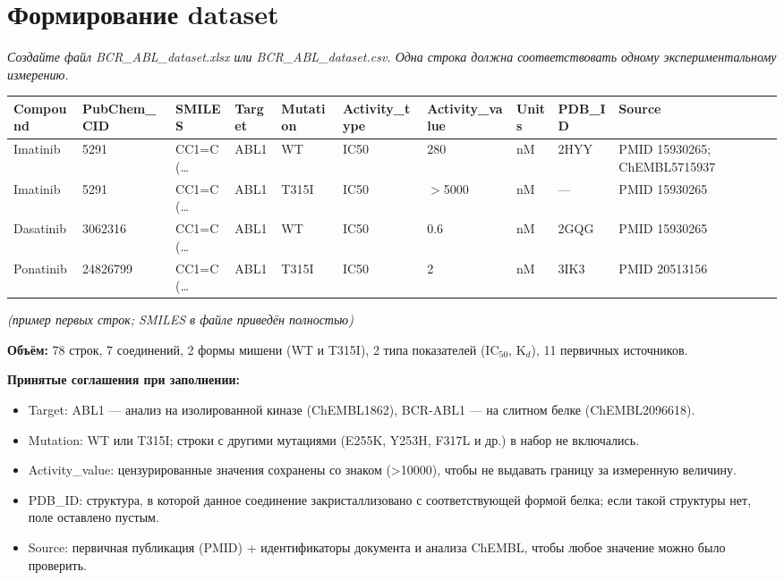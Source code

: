 \documentclass[11pt,a4paper]{article}
\newcommand{\code}[1]{{\ttfamily #1}}
\newcommand{\instr}[1]{{\small\itshape #1\par}}
\begin{document}
\section{Формирование dataset}
\instr{Создайте файл BCR\_ABL\_dataset.xlsx или BCR\_ABL\_dataset.csv. Одна строка должна
соответствовать одному экспериментальному измерению.}

\begin{center}
\tiny
\begin{tabular}{|L{1.5cm}|L{1.1cm}|L{1.4cm}|L{0.9cm}|L{1.1cm}|L{1.0cm}|L{1.0cm}|L{0.6cm}|L{0.9cm}|L{2.3cm}|}
\hline
\textbf{Compound} & \textbf{PubChem\_\allowbreak{}CID} & \textbf{SMILES} & \textbf{Target} &
\textbf{Mutation} & \textbf{Activity\_\allowbreak{}type} & \textbf{Activity\_\allowbreak{}value} & \textbf{Units} &
\textbf{PDB\_ID} & \textbf{Source} \\
\hline
Imatinib & 5291 & CC1=C(\ldots & ABL1 & WT & IC50 & 280 & nM & 2HYY &
PMID 15930265;\allowbreak{} ChEMBL5715937 \\
\hline
Imatinib & 5291 & CC1=C(\ldots & ABL1 & T315I & IC50 & $>$5000 & nM & --- &
PMID 15930265 \\
\hline
Dasatinib & 3062316 & CC1=C(\ldots & ABL1 & WT & IC50 & 0.6 & nM & 2GQG &
PMID 15930265 \\
\hline
Ponatinib & 24826799 & CC1=C(\ldots & ABL1 & T315I & IC50 & 2 & nM & 3IK3 &
PMID 20513156 \\
\hline
\end{tabular}
\end{center}

\emph{(пример первых строк; SMILES в файле приведён полностью)}

\textbf{Объём:} 78 строк, 7 соединений, 2 формы мишени (WT и T315I), 2 типа показателей
(IC$_{50}$, K$_d$), 11 первичных источников.

\textbf{Принятые соглашения при заполнении:}
\begin{itemize}[leftmargin=*,topsep=2pt,itemsep=2pt]
\item \code{Target}: \code{ABL1} --- анализ на изолированной киназе (ChEMBL1862),
\code{BCR-ABL1} --- на слитном белке (ChEMBL2096618).
\item \code{Mutation}: \code{WT} или \code{T315I}; строки с другими мутациями
(E255K, Y253H, F317L и др.) в набор не включались.
\item \code{Activity\_value}: цензурированные значения сохранены со знаком
(\code{>10000}), чтобы не выдавать границу за измеренную величину.
\item \code{PDB\_ID}: структура, в которой данное соединение закристаллизовано с
соответствующей формой белка; если такой структуры нет, поле оставлено пустым.
\item \code{Source}: первичная публикация (PMID) + идентификаторы документа и анализа
ChEMBL, чтобы любое значение можно было проверить.
\end{itemize}
\end{document}
